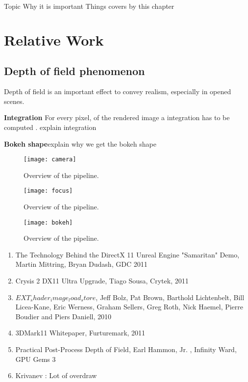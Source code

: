 Topic
Why it is important
Things covers by this chapter

\section{Relative Work}\label{Derousiers:RelativeWork}

\subsection{Depth of field phenomenon}
Depth of field is an important effect to convey realism, especially in opened scenes.

\textbf{Integration} For every pixel, of the rendered image a integration has to be computed . explain integration


\textbf{Bokeh shape}explain why we get the bokeh shape

	\begin{figure}[htb]\centering
	\texttt{[image: camera]}
	\caption{Overview of the pipeline.}
	\label{YourName:fig1}
	\end{figure}


	\begin{figure}[htb]\centering
	\texttt{[image: focus]}
	\caption{Overview of the pipeline.}
	\label{YourName:fig1}
	\end{figure}


	\begin{figure}[htb]\centering
	\texttt{[image: bokeh]}
	\caption{Overview of the pipeline.}
	\label{YourName:fig1}
	\end{figure}

\begin{enumerate}
	\item The Technology Behind the DirectX 11 Unreal Engine "Samaritan" Demo, Martin Mittring, Bryan Dudash, GDC 2011
	\item Crysis 2 DX11 Ultra Upgrade, Tiago Sousa, Crytek, 2011
	\item $EXT_shader_image_load_store$, Jeff Bolz, Pat Brown, Barthold Lichtenbelt, Bill Licea-Kane, Eric Werness, Graham Sellers, Greg Roth, Nick Haemel, Pierre Boudier and Piers Daniell, 2010
	\item 3DMark11 Whitepaper, Furturemark, 2011
	\item Practical Post-Process Depth of Field, Earl Hammon, Jr. , Infinity Ward, GPU Gems 3
	\item Krivanev : Lot of overdraw
\end{enumerate}


